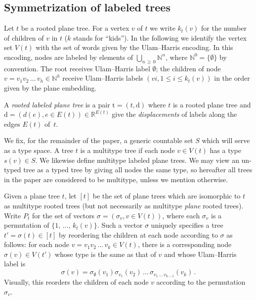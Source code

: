 \documentclass[AHL,Unicode,longabstracts,published]{cedram}
\providecommand{\R}{}
\providecommand{\N}{}
\renewcommand{\R}{\mathbb{R}}
\renewcommand{\N}{\mathbb{N}}
\newcommand{\frkS}{\mathfrak{S}}
\newcommand{\rd}{\mathrm{d}}
\newcommand{\rt}{\mathrm{t}}
\newcommand{\Permvecs}{P}
\newcommand{\R}{\mathbb{R}}
\begin{document}
\subsection{Symmetrization of labeled trees}
Let $t$ be a rooted plane tree. For a vertex $v$ of $t$ we write $k_t(v)$
 for the number of children of $v$ in $t$ ($k$ stands for ``kids''). In the following we identify the vertex set $V(t)$ with the set of words given by the Ulam--Harris encoding. In this encoding, nodes are labeled by elements of $\bigcup_{n\,\ge\,0} \N^n$, where $\N^0=\{\emptyset\}$ by convention. The root receives Ulam--Harris label $\emptyset$; the children of node $v=v_1v_2\,\ldots\,v_h \in \N^h$ receive Ulam--Harris labels $(vi,1 \le i \le k_t(v))$ in the order given by the plane embedding.


A \emph{rooted labeled plane tree} is a pair $\rt=(t,\rd)$ where $t$ is a rooted plane tree and $\rd=(d(e),e \in E(t)) \in \R^{E(t)}$
 give the \emph{displacements} of labels along the edges $E(t)$ of~$t$.


We fix, for the remainder of the paper, a generic countable set $S$ which will serve as a type space. A tree $t$ is a multitype tree if each node $v \in V(t)$ has a type $s(v) \in S$.
 We likewise define multitype labeled plane trees. We may view an un-typed tree as a typed tree by giving all nodes the same type, so hereafter all trees in the paper are considered to be multitype, unless we mention otherwise.

Given a plane tree $t$, let $[t]$
 be the set of plane trees which are isomorphic to $t$ as multitype rooted trees (but not necessarily as multitype \emph{plane} rooted trees). Write $\Permvecs_t$
\nomenclature[Pt]{$\Permvecs_t$}{Set of vectors $(\sigma_v,v\in V(t))$, each $\sigma_v \in \frkS_{k_t(v)}$} for the set of vectors $\sigma=(\sigma_v, v \in V(t))$, where each $\sigma_v$ is a permutation of $\{1,\,\ldots,\,k_t(v)\}$. Such a vector $\sigma$ uniquely specifies a tree $t'=\sigma(t) \in [t]$
 by reordering the children at each node according to $\sigma$ as follows: for each node $v=v_1v_2\,\ldots\,v_k \in V(t)$, there is a corresponding node $\sigma(v) \in V(t')$
 whose type is the same as that of $v$ and whose Ulam--Harris label is
\[
\sigma(v)=\sigma_\emptyset(v_1)\sigma_{v_1}(v_2)\,\ldots\, \sigma_{v_1\,\ldots\,v_{k-1}}(v_k)\,.
\]
Visually, this reorders the children of each node $v$ according to the permutation $\sigma_v$.
\end{document}

